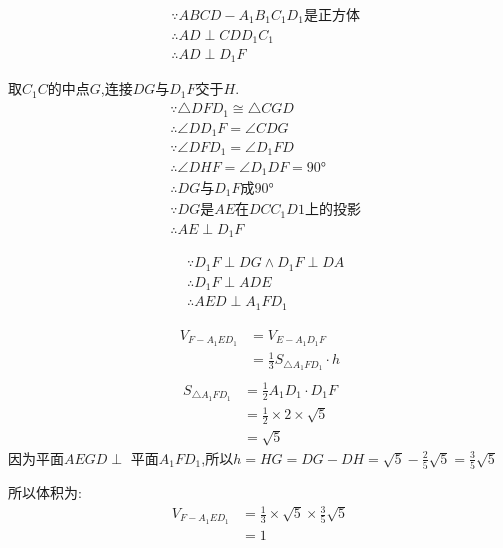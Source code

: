 \documentclass[answers]{exam}
\begin{document}
\begin{questions}
	\begin{solution}
		\begin{penum}
			\item
			\begin{align*}
				 & \because ABCD-A_1B_1C_1D_1\text{是正方体} \\
				 & \therefore AD \perp CDD_1C_1          \\
				 & \therefore AD \perp D_1F
			\end{align*}
			\item
			取$C_1C$的中点$G$,连接$DG$与$D_1F$交于$H$.
			\begin{align*}
				 & \because \triangle{DFD_1} \cong \triangle{CGD}  \\
				 & \therefore \angle{DD_1F} = \angle{CDG}          \\
				 & \because \angle{DFD_1} = \angle{D_1FD}          \\
				 & \therefore \angle{DHF}=\angle{D_1DF} = \ang{90} \\
				 & \therefore DG \text{与} D_1F \text{成}\ang{90}    \\
				 & \because DG \text{是}AE\text{在}DCC_1D1上的投影       \\
				 & \therefore AE \perp D_1F
			\end{align*}
			\item
			\begin{align*}
				 & \because D_1F \perp DG \land D_1F \perp DA \\
				 & \therefore D_1F \perp ADE                  \\
				 & \therefore AED \perp A_1FD_1
			\end{align*}
			\item
			\begin{align*}
				V_{F-A_1ED_1} & = V_{E-A_1D_1F}                        \\
				              & = \frac13S_{\triangle{A_1FD_1}}\cdot h \\
			\end{align*}
			\begin{align*}
				S_{\triangle{A_1FD_1}} & = \frac12A_1D_1\cdot D_1F          \\
				                       & = \frac12 \times 2 \times \sqrt{5} \\
				                       & = \sqrt{5}
			\end{align*}
			因为平面$AEGD \perp$ 平面$A_1FD_1$,所以$h=HG=DG - DH = \sqrt{5} - \frac25{\sqrt{5}} = \frac35\sqrt{5}$

			所以体积为:
			\begin{align*}
				V_{F-A_1ED_1} & = \frac13 \times \sqrt{5} \times \frac35\sqrt{5} \\
				              & = 1
			\end{align*}
		\end{penum}
	\end{solution}

\end{questions}
\end{document}
